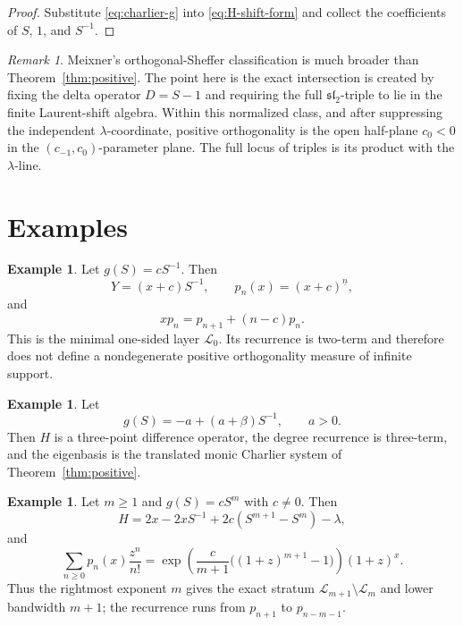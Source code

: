 \documentclass[11pt,reqno]{amsart}
\numberwithin{equation}{section}
\theoremstyle{definition}
\newtheorem{example}[theorem]{Example}
\theoremstyle{remark}
\newtheorem{remark}[theorem]{Remark}
\newcommand{\calL}{\mathcal L}
\begin{document}
\begin{proof}
Substitute \eqref{eq:charlier-g} into \eqref{eq:H-shift-form} and collect the coefficients of $S$, $1$, and $S^{-1}$.
\end{proof}

\begin{remark}
Meixner's orthogonal-Sheffer classification is much broader than Theorem~\ref{thm:positive}.  The point here is the exact intersection is created by fixing the delta operator $D=S-1$ and requiring the full $\mathfrak{sl}_2$-triple to lie in the finite Laurent-shift algebra.  Within this normalized class, and after suppressing the independent $\lambda$-coordinate, positive orthogonality is the open half-plane $c_0<0$ in the $(c_{-1},c_0)$-parameter plane.  The full locus of triples is its product with the $\lambda$-line.
\end{remark}

\section{Examples}

\begin{example}
Let $g(S)=cS^{-1}$.  Then
\[
 Y=(x+c)S^{-1},
 \qquad
 p_n(x)=(x+c)^{\underline n},
\]
and
\[
 xp_n=p_{n+1}+(n-c)p_n.
\]
This is the minimal one-sided layer $\calL_0$.  Its recurrence is two-term and therefore does not define a nondegenerate positive orthogonality measure of infinite support.
\end{example}

\begin{example}
Let
\[
 g(S)=-a+(a+\beta)S^{-1},
 \qquad a>0.
\]
Then $H$ is a three-point difference operator, the degree recurrence is three-term, and the eigenbasis is the translated monic Charlier system of Theorem~\ref{thm:positive}.
\end{example}

\begin{example}
Let $m\ge1$ and $g(S)=cS^m$ with $c\ne0$.  Then
\[
 H=2x-2xS^{-1}+2c(S^{m+1}-S^m)-\lambda,
\]
and
\[
 \sum_{n\ge0}p_n(x)\frac{z^n}{n!}
 =\exp\!\left(\frac{c}{m+1}\bigl((1+z)^{m+1}-1\bigr)\right)(1+z)^x.
\]
Thus the rightmost exponent $m$ gives the exact stratum $\calL_{m+1}\setminus\calL_m$ and lower bandwidth $m+1$; the recurrence runs from $p_{n+1}$ to $p_{n-m-1}$.
\end{example}
\end{document}
